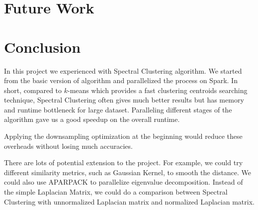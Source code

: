 \documentclass{acm_proc_article-sp}
\begin{document}
\section{Future Work}


\section{Conclusion}
In this project we experienced with Spectral Clustering algorithm. We started from the basic version of algorithm and parallelized the process on Spark. In short, compared to $k$-means which provides a fast clustering centroids searching technique, Spectral Clustering often gives much better results but has memory and runtime bottleneck for large dataset. Paralleling different stages of the algorithm gave us a good speedup on the overall runtime.


Applying the downsampling optimization at the beginning would reduce these overheads without losing much accuracies.  

There are lots of potential extension to the project. For example, we could try different similarity metrics, such as Gaussian Kernel, to smooth the distance. We could also use APARPACK to parallelize eigenvalue decomposition. Instead of the simple Laplacian Matrix, we could do a comparison between Spectral Clustering with unnormalized Laplacian matrix and normalized Laplacian matrix.

%
%

\balancecolumns
\end{document}
